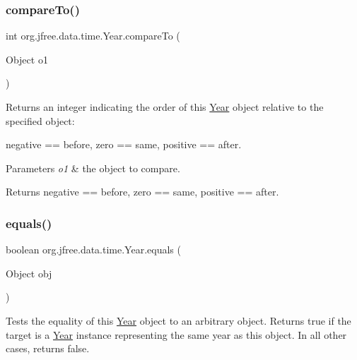 \subsubsection{\texorpdfstring{compare\+To()}{compareTo()}}
{\footnotesize\ttfamily int org.\+jfree.\+data.\+time.\+Year.\+compare\+To (\begin{DoxyParamCaption}\item[{Object}]{o1 }\end{DoxyParamCaption})}

Returns an integer indicating the order of this {\ttfamily \mbox{\hyperlink{classorg_1_1jfree_1_1data_1_1time_1_1_year}{Year}}} object relative to the specified object\+:

negative == before, zero == same, positive == after.


\begin{DoxyParams}{Parameters}
{\em o1} & the object to compare.\\
\hline
\end{DoxyParams}
\begin{DoxyReturn}{Returns}
negative == before, zero == same, positive == after. 
\end{DoxyReturn}
\mbox{\label{classorg_1_1jfree_1_1data_1_1time_1_1_year_ac994c8806ffdc5244ce2f4e9c4cf953d}} 
\subsubsection{\texorpdfstring{equals()}{equals()}}
{\footnotesize\ttfamily boolean org.\+jfree.\+data.\+time.\+Year.\+equals (\begin{DoxyParamCaption}\item[{Object}]{obj }\end{DoxyParamCaption})}

Tests the equality of this {\ttfamily \mbox{\hyperlink{classorg_1_1jfree_1_1data_1_1time_1_1_year}{Year}}} object to an arbitrary object. Returns {\ttfamily true} if the target is a {\ttfamily \mbox{\hyperlink{classorg_1_1jfree_1_1data_1_1time_1_1_year}{Year}}} instance representing the same year as this object. In all other cases, returns {\ttfamily false}.



